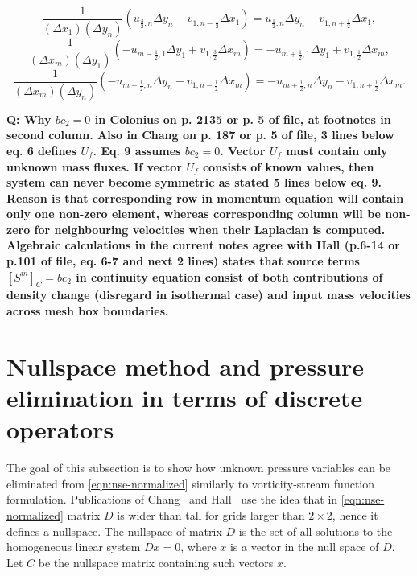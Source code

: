 \documentclass{article}
\numberwithin{equation}{section}
\begin{document}
\begin{enumerate}
\begin{equation}
		\end{equation}
		\begin{equation}
			\frac{1}{\left(\Delta{x_1}\right)\left(\Delta{y_n}\right)} \left(u_{\frac{3}{2},n}\Delta y_n  - v_{1,n-\frac{1}{2}}\Delta x_1\right)=u_{\frac{1}{2},n}\Delta y_n-v_{1,n+\frac{1}{2}}\Delta x_1,
		\end{equation}
		\begin{equation}
			\frac{1}{\left(\Delta{x_m}\right)\left(\Delta{y_1}\right)} \left(-u_{m-\frac{1}{2},1}\Delta y_1 +v_{1,\frac{3}{2}}\Delta x_m \right)=-u_{m+\frac{1}{2},1}\Delta y_1+ v_{1,\frac{1}{2}}\Delta x_m,
		\end{equation}
		\begin{equation}
			\frac{1}{\left(\Delta{x_m}\right)\left(\Delta{y_n}\right)} \left(-u_{m-\frac{1}{2},n}\Delta y_n  - v_{1,n-\frac{1}{2}}\Delta x_m\right)=-u_{m+\frac{1}{2},n}\Delta y_n-v_{1,n+\frac{1}{2}}\Delta x_m.
		\end{equation}
\end{enumerate}



\textbf{Q: Why $bc_2=0$ in Colonius\cite{Colonius:2008} on p. 2135 or p. 5 of file, at footnotes in second column. Also in Chang\cite{Chang:2002} on p. 187 or p. 5 of file, 3 lines below eq. 6 defines $U_f$. Eq. 9 assumes $bc_2=0$. Vector $U_f$ must contain only unknown mass fluxes. If vector $U_f$  consists of known values, then system can never become symmetric as stated 5 lines below eq. 9. Reason is that corresponding row in momentum equation will contain only one non-zero element, whereas corresponding column will be non-zero for neighbouring velocities when their Laplacian is computed. Algebraic calculations in the current notes agree with Hall\cite{Hall:1980} (p.6-14 or p.101 of file, eq. 6-7 and next 2 lines) states that source terms $[S^m]_C=bc_2$ in continuity equation consist of both contributions of density change (disregard in isothermal case) and input mass velocities across mesh box boundaries.}
 



\pagebreak
\section{Nullspace method and pressure elimination in terms of discrete operators}\label{sec:nullspace-method}

The goal of this subsection is to show how unknown pressure variables can be eliminated from \cref{eqn:nse-normalized} similarly to vorticity-stream function formulation. 
Publications of Chang~\cite{Chang:2002} and Hall~\cite{Hall:1980} use the idea that in \cref{eqn:nse-normalized} matrix $D$ is wider than tall for grids larger than $2\times 2$, hence it defines a nullspace. 
The nullspace of matrix $D$ is the set of all solutions to the homogeneous linear system $Dx = 0$, where $x$ is a vector in the null space of $D$. Let $C$ be the nullspace matrix containing such vectors $x$. 
\end{document}
